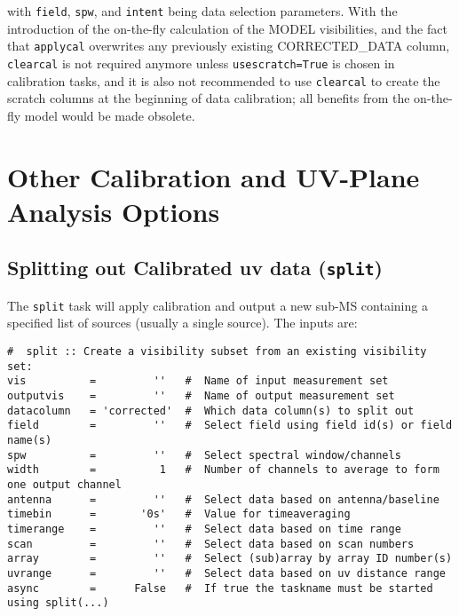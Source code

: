 with {\tt field}, {\tt spw}, and {\tt intent} being data selection
parameters. With the introduction of the on-the-fly calculation of the
MODEL visibilities, and the fact that {\tt applycal} overwrites any
previously existing CORRECTED\_DATA column, {\tt clearcal} is not
required anymore unless {\tt usescratch=True} is chosen in calibration
tasks, and it is also not recommended to use {\tt clearcal} to create
the scratch columns at the beginning of data calibration; all benefits
from the on-the-fly model would be made obsolete.

\section{Other Calibration and UV-Plane Analysis Options}
\label{section:cal.other}

\subsection{Splitting out Calibrated uv data ({\tt split})}
\label{section:cal.other.split}

The {\tt split} task will apply calibration and output a new sub-MS
containing a specified list of sources (usually a single source).
The inputs are:
\small
\begin{verbatim}
#  split :: Create a visibility subset from an existing visibility set:
vis          =         ''   #  Name of input measurement set
outputvis    =         ''   #  Name of output measurement set
datacolumn   = 'corrected'  #  Which data column(s) to split out
field        =         ''   #  Select field using field id(s) or field name(s)
spw          =         ''   #  Select spectral window/channels
width        =          1   #  Number of channels to average to form one output channel
antenna      =         ''   #  Select data based on antenna/baseline
timebin      =       '0s'   #  Value for timeaveraging
timerange    =         ''   #  Select data based on time range
scan         =         ''   #  Select data based on scan numbers
array        =         ''   #  Select (sub)array by array ID number(s)
uvrange      =         ''   #  Select data based on uv distance range
async        =      False   #  If true the taskname must be started using split(...)
\end{verbatim}
\normalsize

